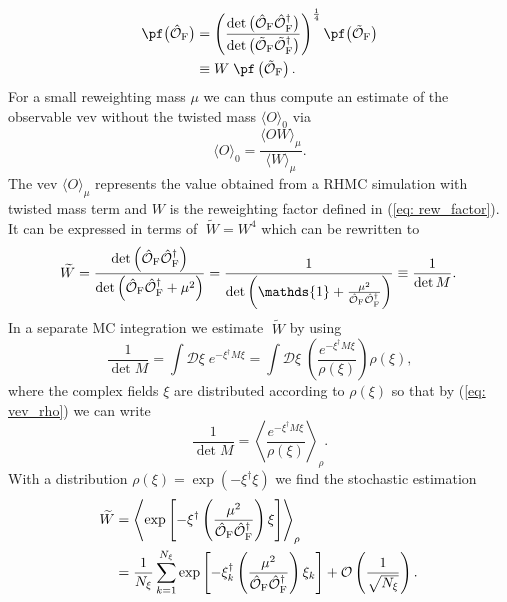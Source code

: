 %
%
\begin{equation}
\begin{alignedat}{2}
\pf\big(\hat{\mathcal{O}}_{\rm F}\big) &= \left(\frac{\det \big(\hat{\mathcal{O}}_{\rm F} \hat{\mathcal{O}}_{\rm F}^{\dagger} \big)}{\det \big(\tilde{\mathcal{O}}_{\rm F} \tilde{\mathcal{O}}_{\rm F}^{\dagger} \big)}\right)^{\frac{1}{4}} \pf\big(\tilde{\mathcal{O}}_{\rm F}\big)\\
%
&\equiv W \;\pf\left(\tilde{\mathcal{O}}_{\rm F}\right).
\end{alignedat}
\label{eq: rew_factor}
\end{equation}
%
%
For a small reweighting mass $\mu$ we can thus compute an estimate of the observable vev without the twisted mass $\langle O \rangle_{0}$ via
%
%
\begin{equation}
\langle O \rangle_{0} = \frac{\langle O W \rangle_{\mu}}{\langle W \rangle_{\mu}} .
\end{equation}
%
%
The vev $\langle O \rangle_{\mu}$ represents the value obtained from a RHMC simulation with twisted mass term and $W$ is the reweighting factor defined in (\ref{eq: rew_factor}). It can be expressed in terms of $\;\widetilde{\!W}=W^{4}$ which can be rewritten to
%
%
\begin{equation}
\widetilde{\!W} = \frac{\det \left(\hat{\mathcal{O}}_{\rm F}\hat{\mathcal{O}}_{\rm F}^{\dagger}\right)}{\det\left(\hat{\mathcal{O}}_{\rm F}\hat{\mathcal{O}}_{\rm F}^{\dagger}+ \mu^{2}\right)} = \frac{1}{\det\left( \mathds{1}+\frac{\mu^{2}}{\hat{\mathcal{O}}_{\rm F}\hat{\mathcal{O}}_{\rm F}^{\dagger}}\right)} \equiv \frac{1}{\det M}.
\end{equation}
%
%
In a separate MC integration we estimate $\;\widetilde{\!W}$ by using
%
%
\begin{equation}
\frac{1}{\det M} = \int \mathcal{D}\xi \; e^{-\xi^{\dagger}M\xi} = \int \mathcal{D}\xi\; \left(\frac{e^{-\xi^{\dagger}M\xi}}{\rho(\xi)}\right) \rho(\xi),
\end{equation}
%
%
where the complex fields $\xi$ are distributed according to $\rho(\xi)$ so that by (\ref{eq: vev_rho}) we can write
%
%
\begin{equation}
\frac{1}{\det M} = \left\langle \frac{e^{-\xi^{\dagger}M\xi}}{\rho(\xi)}\right\rangle_{\rho}.
\end{equation}
%
%
With a  distribution $\rho(\xi)=\exp(-\xi^{\dagger}\xi)$ we find the stochastic estimation
%
%
\begin{equation}
\begin{alignedat}{2}
\widetilde{\!W} &= \left\langle \exp \left[ -\xi^{\dagger}\left(\frac{\mu^{2}}{\hat{\mathcal{O}}_{\rm F}\hat{\mathcal{O}}_{\rm F}^{\dagger}}\right)\xi\right]\right\rangle_{\rho} \\
&= \frac{1}{N_{\xi}} \sum\limits_{k=1}^{N_{\xi}} \exp \left[ -\xi_{k}^{\dagger}\left(\frac{\mu^{2}}{\hat{\mathcal{O}}_{\rm F}\hat{\mathcal{O}}_{\rm F}^{\dagger}}\right)\xi_{k}\right] + \mathcal{O}\left(\frac{1}{\sqrt{N_{\xi}}}\right). 
\end{alignedat}
\end{equation}
